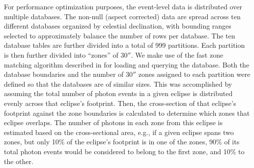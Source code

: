 \documentclass[5p]{elsarticle}
\begin{document}
For performance optimization purposes, the event-level data is distributed over multiple databases. The non-null (aspect corrected) data are spread across ten different databases organized by celestial declination, with bounding ranges selected to approximately balance the number of rows per database.  The ten database tables are further divided into a total of 999 partitions. Each partition is then further divided into ``zones'' of $30''$. We make use of the fast zone matching algorithm described in \citet{gra2006} for loading and querying the database.  Both the database boundaries and the number of $30''$ zones assigned to each partition were defined so that the databases are of similar sizes.  This was accomplished by assuming the total number of photon events in a given eclipse is distributed evenly across that eclipse's footprint.  Then, the cross-section of that eclipse's footprint against the zone boundaries is calculated to determine which zones that eclipse overlaps.  The number of photons in each zone from this eclipse is estimated based on the cross-sectional area, e.g., if a given eclipse spans two zones, but only 10\% of the eclipse's footprint is in one of the zones, 90\% of its total photon events would be considered to belong to the first zone, and 10\% to the other.
\end{document}
